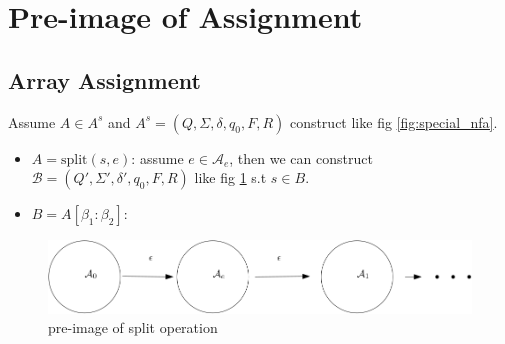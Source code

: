 \documentclass[12pt]{article}
\theoremstyle{remark}
\begin{document}
\section{Pre-image of Assignment}
\subsection{Array Assignment}
Assume $A\in A^s$ and $A^s=(Q, \Sigma, \delta,q_0,F,R)$ construct like fig \ref{fig:special_nfa}.
\begin{itemize}
    \item $A = \mathrm{split}(s,e)$: assume $e\in \mathcal{A}_e$, then we can construct $\mathcal{B}=(Q', \Sigma', \delta',q_0,F,R)$ like fig \ref{fig:pre_image_split} s.t $s\in B$.
    \item $B = A[\beta_1:\beta_2]$:  
\end{itemize}
\begin{figure}
    \includegraphics[width=\linewidth]{pre_image_split.png}
    \caption{pre-image of split operation}
    \label{fig:pre_image_split}
\end{figure}
\end{document}
